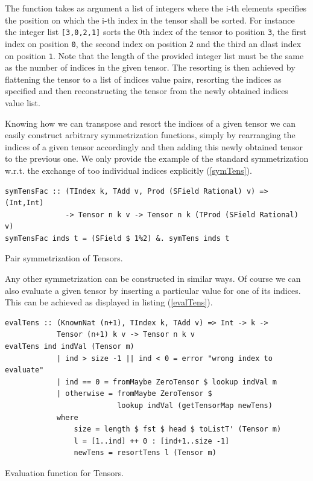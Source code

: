 \documentclass[a4paper,12pt, DIV=14, BCOR=5mm, twoside, headsepline, numbers=noenddot]{scrbook}
\begin{document}
The function takes as argument a list of integers where the i-th elements specifies the position on which the i-th index in the tensor shall be sorted. For instance the integer list \texttt{[3,0,2,1]} sorts the 0th index of the tensor to position \texttt{3}, the first index on position \texttt{0}, the second index on position \texttt{2} and the third an dlast index on position \texttt{1}. Note that the length of the provided integer list must be the same as the number of indices in the given tensor.  The resorting is then achieved by flattening the tensor to a list of indices value pairs, resorting the indices as specified and then reconstructing the tensor from the newly obtained indices value list. 

Knowing how we can transpose and resort the indices of a given tensor we can easily construct arbitrary symmetrization functions, simply by rearranging the indices of a given tensor accordingly and then adding this newly obtained tensor to the previous one. We only provide the example of the standard symmetrization w.r.t. the exchange of too individual indices explicitly (\ref{symTens}).

\begin{listing}[hbt!] 
\begin{verbatim}
symTensFac :: (TIndex k, TAdd v, Prod (SField Rational) v) => (Int,Int)
              -> Tensor n k v -> Tensor n k (TProd (SField Rational) v)
symTensFac inds t = (SField $ 1%2) &. symTens inds t
\end{verbatim} 
\caption{Pair symmetrization of Tensors.}\label{symTens}
\end{listing}

Any other symmetrization can be constructed in similar ways.
Of course we can also evaluate a given tensor by inserting a particular value for one of its indices. This can be achieved as displayed in listing (\ref{evalTens}).

\begin{listing}[hbt!] 
\begin{verbatim}
evalTens :: (KnownNat (n+1), TIndex k, TAdd v) => Int -> k ->
            Tensor (n+1) k v -> Tensor n k v
evalTens ind indVal (Tensor m)
            | ind > size -1 || ind < 0 = error "wrong index to evaluate"
            | ind == 0 = fromMaybe ZeroTensor $ lookup indVal m
            | otherwise = fromMaybe ZeroTensor $
                          lookup indVal (getTensorMap newTens)
            where
                size = length $ fst $ head $ toListT' (Tensor m)
                l = [1..ind] ++ 0 : [ind+1..size -1]
                newTens = resortTens l (Tensor m)
\end{verbatim}
\caption{Evaluation function for Tensors.}\label{evalTens}
\end{listing}
\end{document}
